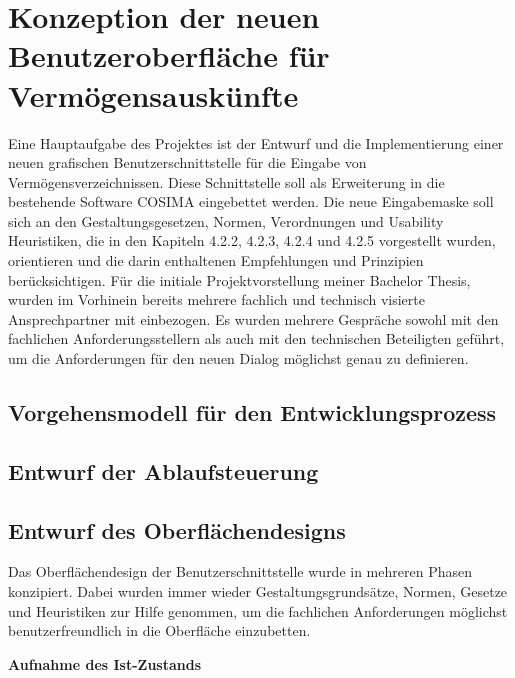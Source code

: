 \section{Konzeption der neuen Benutzeroberfläche für Vermögensauskünfte}
Eine Hauptaufgabe des Projektes ist der Entwurf und die Implementierung einer neuen grafischen Benutzerschnittstelle für die Eingabe von Vermögensverzeichnissen. Diese Schnittstelle soll als Erweiterung in die bestehende Software COSIMA eingebettet werden. Die neue Eingabemaske soll sich an den Gestaltungsgesetzen, Normen, Verordnungen und Usability Heuristiken, die in den Kapiteln 4.2.2, 4.2.3, 4.2.4 und 4.2.5 vorgestellt wurden, orientieren und die darin enthaltenen Empfehlungen und Prinzipien berücksichtigen. Für die initiale Projektvorstellung meiner Bachelor Thesis, wurden im Vorhinein bereits mehrere fachlich und technisch visierte Ansprechpartner mit einbezogen. Es wurden mehrere Gespräche sowohl mit den fachlichen Anforderungsstellern als auch mit den technischen Beteiligten geführt, um die Anforderungen für den neuen Dialog möglichst genau zu definieren.

\subsection{Vorgehensmodell für den Entwicklungsprozess}


\subsection{Entwurf der Ablaufsteuerung}

\subsection{Entwurf des Oberflächendesigns}
Das Oberflächendesign der Benutzerschnittstelle wurde in mehreren Phasen konzipiert. Dabei wurden immer wieder Gestaltungsgrundsätze, Normen, Gesetze und Heuristiken zur Hilfe genommen, um die fachlichen Anforderungen möglichst benutzerfreundlich in die Oberfläche einzubetten.

\textbf{Aufnahme des Ist-Zustands}

